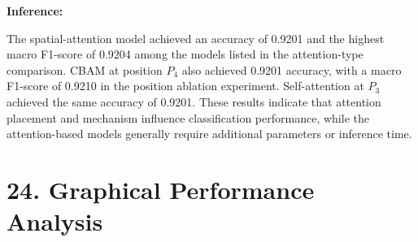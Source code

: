 \documentclass[10pt]{article}
\begin{document}
\begin{table}[H]
\centering
\caption{Main Results for the Baseline and Attention-Based ResNet50 Models}
\label{tab:main_results}
\end{table}

\noindent\textbf{Inference:}

The spatial-attention model achieved an accuracy of 0.9201 and the
highest macro F1-score of 0.9204 among the models listed in the
attention-type comparison. CBAM at position $P_4$ also achieved
0.9201 accuracy, with a macro F1-score of 0.9210 in the position
ablation experiment. Self-attention at $P_3$ achieved the same
accuracy of 0.9201. These results indicate that attention placement
and mechanism influence classification performance, while the
attention-based models generally require additional parameters or
inference time.

\section*{24. Graphical Performance Analysis}
\end{document}
